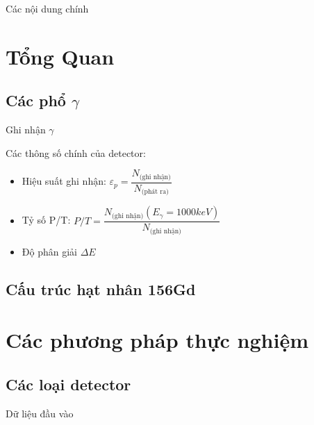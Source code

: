 \documentclass[11pt, hyperref={unicode}]{beamer}
\begin{document}
\logo{}

\begin{frame}{Các nội dung chính}
\tableofcontents
\end{frame}

\section{Tổng Quan}

\subsection{Các phổ $\gamma$}

\begin{frame}[label = ghinhan]{Ghi nhận $\gamma$}

Các thông số chính của detector:

\begin{itemize}

\item<2-> Hiệu suất ghi nhận: $\varepsilon_{p} = \dfrac{N_\text{(ghi nhận)}}{N_\text{(phát ra)}}$

\item<3-> Tỷ số P/T: $P/T = \dfrac{N_\text{(ghi nhận)}(E_{\gamma} = 1000 keV)}{N_\text{(ghi nhận)}}$

\item<4-> Độ phân giải $\Delta E$

\end{itemize}


\end{frame}






\subsection{Cấu trúc hạt nhân 156Gd}


\section{Các phương pháp thực nghiệm}
\subsection{Các loại detector}
\begin{frame}{Dữ liệu đầu vào}
\end{frame}
\end{document}
